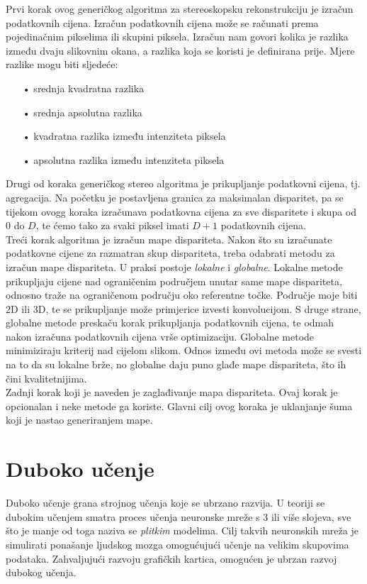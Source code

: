 \documentclass[times, utf8, zavrsni, numeric]{fer}
\begin{document}
Prvi korak ovog generičkog algoritma za stereoskopsku rekonstrukciju je izračun podatkovnih cijena. Izračun podatkovnih cijena može se računati prema pojedinačnim pikselima ili skupini piksela.  Izračun nam govori kolika je razlika između dvaju slikovnim okana, a razlika koja se koristi je definirana prije. Mjere razlike mogu biti sljedeće:
\begin{itemize}
\item[•] srednja kvadratna razlika
\item[•] srednja apsolutna razlika
\item[•] kvadratna razlika između intenziteta piksela
\item[•] apsolutna razlika između intenziteta piksela
\end{itemize}

\newpage
Drugi od koraka generičkog stereo algoritma je prikupljanje podatkovni cijena, tj. agregacija.  Na početku je postavljena granica za maksimalan disparitet, pa se tijekom ovogg koraka izračunava podatkovna cijena za sve disparitete i skupa  od $0$ do $D$, te ćemo tako za svaki piksel imati $D+1$ podatkovnih cijena.\\
Treći korak algoritma je izračun mape dispariteta. Nakon što su izračunate podatkovne cijene za razmatran skup dispariteta, treba odabrati metodu za izračun mape dispariteta. U praksi postoje \textit{lokalne} i \textit{globalne}. Lokalne metode prikupljaju cijene nad ograničenim područjem unutar same mape dispariteta, odnosno traže na ograničenom području oko referentne točke. Područje moje biti 2D ili 3D, te se prikupljanje može primjerice izvesti konvolucijom. S druge strane, globalne metode  preskaču korak prikupljanja podatkovnih cijena, te odmah nakon izračuna podatkovnih cijena vrše optimizaciju. Globalne metode minimiziraju kriterij nad cijelom slikom. Odnos između ovi metoda može se svesti na to da su lokalne brže, no globalne daju puno glađe mape dispariteta, što ih čini kvalitetnijima.\\
Zadnji korak koji je naveden je zaglađivanje mapa dispariteta. Ovaj korak je opcionalan i neke metode ga koriste. Glavni cilj ovog koraka je uklanjanje šuma koji je nastao generiranjem mape. 
\chapter{Duboko učenje}
Duboko učenje grana strojnog učenja koje se ubrzano razvija. U teoriji se dubokim učenjem smatra proces učenja neuronske mreže s 3 ili više slojeva, sve što je manje od toga naziva se \textit{plitkim} modelima. Cilj takvih neuronskih mreža je simulirati ponašanje ljudskog mozga omogućujući učenje na velikim skupovima podataka. Zahvaljujući razvoju grafičkih kartica, omogućen je ubrzan razvoj dubokog učenja.
\end{document}
